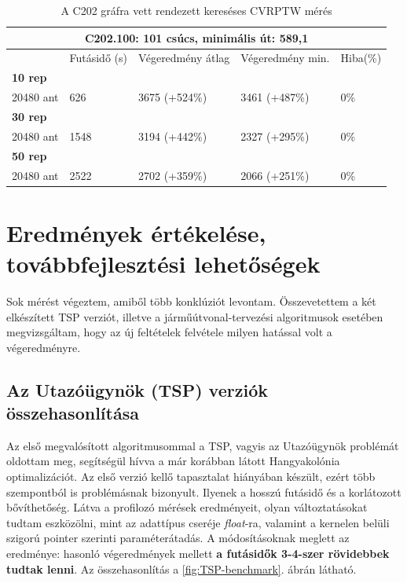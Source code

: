 \begin{table}[ht!]
	\centering
	\begin{tabular}{|p{1.75cm}||p{2cm}|p{3.25cm}|p{3.25cm}|p{1.5cm}|}
		\hline
		\multicolumn{5}{|c|}{C202.100: 101 csúcs, minimális út: 589,1} \\
		\hline
		& Futásidő (s) & Végeredmény átlag & Végeredmény min. & Hiba(\%) \\
		\hline
		\textbf{10 rep} &  &  &  & \\
		20480 ant & 626 & 3675 (+524\%) & 3461 (+487\%) &  0\% \\
		\hline
		\textbf{30 rep} &  &  &  & \\
		20480 ant & 1548 & 3194 (+442\%) & 2327 (+295\%) &  0\% \\
		\hline
		\textbf{50 rep} &  &  &  &  \\
		20480 ant & 2522 & 2702 (+359\%) & 2066 (+251\%) &  0\% \\
		\hline
	\end{tabular}
	\caption{A C202 gráfra vett rendezett kereséses CVRPTW mérés}
	\label{table:VRTPW2_100_3}
\end{table}

\chapter{Eredmények értékelése, továbbfejlesztési lehetőségek} \label{results_section}
Sok mérést végeztem, amiből több konklúziót levontam. Összevetettem a két elkészített TSP verziót, illetve a járműútvonal-tervezési algoritmusok esetében megvizsgáltam, hogy az új feltételek felvétele milyen hatással volt a végeredményre.

\section{Az Utazóügynök (TSP) verziók összehasonlítása}

Az első megvalósított algoritmusommal a TSP, vagyis az Utazóügynök problémát oldottam meg, segítségül hívva a már korábban látott Hangyakolónia optimalizációt. Az első verzió kellő tapasztalat hiányában készült, ezért több szempontból is problémásnak bizonyult. Ilyenek a hosszú futásidő és a korlátozott bővíthetőség. Látva a profilozó mérések eredményeit, olyan változtatásokat tudtam eszközölni, mint az adattípus cseréje \textit{float}-ra, valamint a kernelen belüli szigorú pointer szerinti paraméterátadás. A módosításoknak meglett az eredménye: hasonló végeredmények mellett \textbf{a futásidők 3-4-szer rövidebbek tudtak lenni}. Az összehasonlítás a \ref{fig:TSP-benchmark}. ábrán látható.

